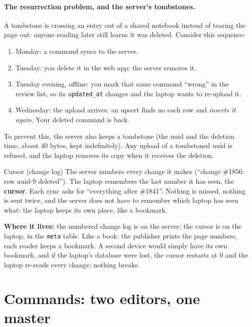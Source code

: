 \documentclass[11pt,a4paper]{article}
\begin{document}
\paragraph{The resurrection problem, and the server's tombstones.} A tombstone is crossing an
entry out of a shared notebook instead of tearing the page out: anyone reading later still learns
it was deleted. Consider this sequence:
\begin{enumerate}[nosep]
  \item Monday: a command syncs to the server.
  \item Tuesday: you delete it in the web app; the server removes it.
  \item Tuesday evening, offline: you mark that same command ``wrong'' in the review list, so its
        \texttt{updated\_at} changes and the laptop wants to re-upload it.
  \item Wednesday: the upload arrives; an upsert finds no such row and \emph{inserts it again}.
        Your deleted command is back.
\end{enumerate}
\noindent To prevent this, the server also keeps a tombstone (the uuid and the deletion time, about
40 bytes, kept indefinitely). Any upload of a tombstoned uuid is refused, and the laptop removes
its copy when it receives the deletion.

\begin{concept}{Cursor (change log)}
The server numbers every change it makes (``change \#1856: row uuid-9 deleted''). The laptop
remembers the last number it has seen, the \textbf{cursor}. Each sync asks for ``everything
after \#1841''. Nothing is missed, nothing is sent twice, and the server does not have to
remember which laptop has seen what: the laptop keeps its own place, like a bookmark.
\end{concept}

\noindent \textbf{Where it lives:} the numbered change log is on the server; the cursor is on the
laptop, in the \texttt{meta} table. Like a book: the publisher prints the page numbers, each
reader keeps a bookmark. A second device would simply have its own bookmark, and if the laptop's
database were lost, the cursor restarts at 0 and the laptop re-reads every change; nothing
breaks.

\section{Commands: two editors, one master}
\end{document}
